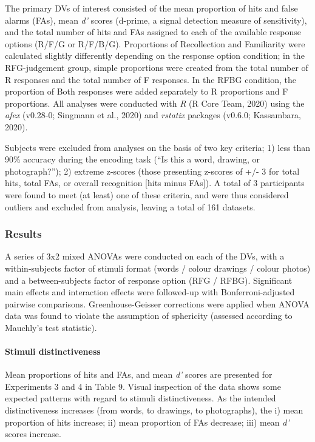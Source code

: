 \documentclass[
  11pt,
]{article}
\begin{document}
\hfill\break The primary DVs of interest consisted of the mean
proportion of hits and false alarms (FAs), mean \emph{d'} scores
(d-prime, a signal detection measure of sensitivity), and the total
number of hits and FAs assigned to each of the available response
options (R/F/G or R/F/B/G). Proportions of Recollection and Familiarity
were calculated slightly differently depending on the response option
condition; in the RFG-judgement group, simple proportions were created
from the total number of R responses and the total number of F
responses. In the RFBG condition, the proportion of Both responses were
added separately to R proportions and F proportions. All analyses were
conducted with \emph{R} (R Core Team, 2020) using the \emph{afex}
(v0.28-0; Singmann et al., 2020) and \emph{rstatix} packages (v0.6.0;
Kassambara, 2020).

Subjects were excluded from analyses on the basis of two key criteria;
1) less than 90\% accuracy during the encoding task (``Is this a word,
drawing, or photograph?''); 2) extreme z-scores (those presenting
z-scores of +/- 3 for total hits, total FAs, or overall recognition
{[}hits minus FAs{]}). A total of 3 participants were found to meet (at
least) one of these criteria, and were thus considered outliers and
excluded from analysis, leaving a total of 161 datasets.

\hypertarget{results-3}{%
\subsubsection{Results}\label{results-3}}

A series of 3x2 mixed ANOVAs were conducted on each of the DVs, with a
within-subjects factor of stimuli format (words / colour drawings /
colour photos) and a between-subjects factor of response option (RFG /
RFBG). Significant main effects and interaction effects were followed-up
with Bonferroni-adjusted pairwise comparisons. Greenhouse-Geisser
corrections were applied when ANOVA data was found to violate the
assumption of sphericity (assessed according to Mauchly's test
statistic).

\hypertarget{stimuli-distinctiveness-1}{%
\paragraph{Stimuli distinctiveness}\label{stimuli-distinctiveness-1}}

\hfill\break Mean proportions of hits and FAs, and mean \emph{d'} scores
are presented for Experiments 3 and 4 in Table 9. Visual inspection of
the data shows some expected patterns with regard to stimuli
distinctiveness. As the intended distinctiveness increases (from words,
to drawings, to photographs), the i) mean proportion of hits increase;
ii) mean proportion of FAs decrease; iii) mean \emph{d'} scores
increase.
\end{document}
